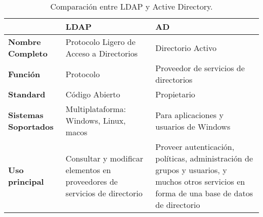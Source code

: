 \begin{table}[H]
	\centering
	\begin{tabular}{ |p{4cm}||p{4cm}|p{4cm}| }
		\hline
		 &\textbf{LDAP}&\textbf{AD}\\
		\hline
		\textbf{Nombre Completo }  &  Protocolo Ligero de Acceso a Directorios  &Directorio Activo\\
		\hline
		\textbf{Función}& Protocolo&Proveedor de servicios de directorios\\
		\hline
		\textbf{Standard} &Código Abierto & Propietario\\
		\hline
		\textbf{Sistemas Soportados}&Multiplataforma: Windows, Linux, macos & Para aplicaciones y usuarios de Windows\\
		\hline
		\textbf{Uso principal}&   Consultar y modificar elementos en proveedores de servicios de directorio & Proveer autenticación, políticas, administración de grupos y usuarios, y muchos otros servicios en forma de una base de datos de directorio\\
		\hline
	\end{tabular}
	\caption{\label{tab:table-name}Comparación entre LDAP y Active Directory.}
\end{table}